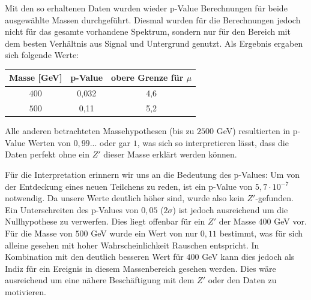 Mit den so erhaltenen Daten wurden wieder p-Value Berechnungen für beide ausgewählte Massen durchgeführt.
Diesmal wurden für die Berechnungen jedoch nicht für das gesamte vorhandene Spektrum, sondern nur für den Bereich mit dem besten Verhältnis aus Signal und Untergrund genutzt.
Als Ergebnis ergaben sich folgende Werte:
\begin{center}
\begin{tabular}{c | c | c }
Masse [GeV] & p-Value & obere Grenze für $\mu$ \\
\hline
$400$ & 0,032 & 4,6 \\
$500$ & 0,11 & 5,2 \\
\end{tabular}
\end{center}
Alle anderen betrachteten Massehypothesen (bis zu $2500$ GeV) resultierten in p-Value Werten von $0,99...$ oder gar $1$, was sich so interpretieren lässt, dass die Daten perfekt ohne ein $Z'$ dieser Masse erklärt werden können.

Für die Interpretation erinnern wir uns an die Bedeutung des p-Values: Um von der Entdeckung eines neuen Teilchens zu reden, ist ein p-Value von $5,7 \cdot 10^{-7}$ notwendig.
Da unsere Werte deutlich höher sind, wurde also kein $Z'$-gefunden.
Ein Unterschreiten des p-Values von $0,05$ ($2 \sigma$) ist jedoch ausreichend um die Nullhypothese zu verwerfen.
Dies liegt offenbar für ein $Z'$ der Masse $400$ GeV vor.
Für die Masse von $500$ GeV wurde ein Wert von nur $0,11$ bestimmt, was für sich alleine gesehen mit hoher Wahrscheinlichkeit Rauschen entspricht.
In Kombination mit den deutlich besseren Wert für $400$ GeV kann dies jedoch als Indiz für ein Ereignis in diesem Massenbereich gesehen werden.
Dies wäre ausreichend um eine nähere Beschäftigung mit dem $Z'$ oder den Daten zu motivieren.

\clearpage
